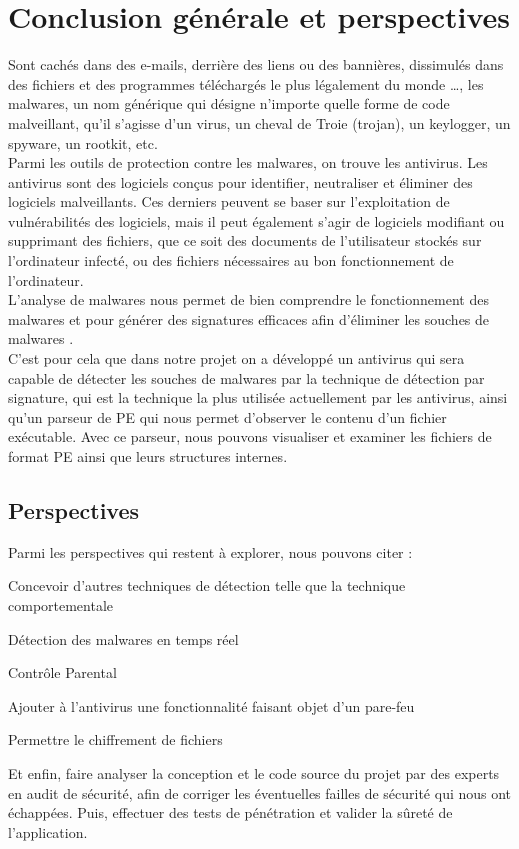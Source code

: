 \newpage
\chapter*{Conclusion générale et perspectives}
Sont cachés dans des e-mails, derrière des liens ou des bannières, dissimulés dans des fichiers et des programmes téléchargés le plus légalement du monde …, les malwares, un nom générique qui désigne n'importe quelle forme de code malveillant, qu'il s'agisse d'un virus, un cheval de Troie (trojan), un keylogger, un spyware, un rootkit, etc.\\

Parmi les outils de protection contre les malwares, on trouve les antivirus. Les antivirus sont des logiciels conçus pour identifier, neutraliser et éliminer des logiciels malveillants. Ces derniers peuvent se baser sur l'exploitation de vulnérabilités des logiciels, mais il peut également s'agir de logiciels modifiant ou supprimant des fichiers, que ce soit des documents de l'utilisateur stockés sur l'ordinateur infecté, ou des fichiers nécessaires au bon fonctionnement de l'ordinateur.\\

L'analyse de malwares nous permet de bien comprendre le fonctionnement des malwares et pour générer des signatures efficaces afin d'éliminer les souches de malwares .\\

C'est pour cela que dans notre projet on a développé un antivirus qui sera capable de détecter les souches de malwares par la technique de détection par signature, qui est la technique la plus utilisée actuellement par les antivirus, ainsi qu'un parseur de PE qui nous permet d'observer le contenu d'un fichier exécutable. Avec ce parseur,  nous pouvons visualiser et examiner les fichiers de format PE ainsi que leurs structures internes.\\

\section*{Perspectives}

Parmi les perspectives qui restent à explorer, nous pouvons citer :\\
\begin{list}{•}{}
\item Concevoir d'autres techniques de détection telle que la technique comportementale
\item Détection des malwares en temps réel
\item Contrôle Parental
\item Ajouter à l'antivirus une fonctionnalité faisant objet d'un pare-feu
\item Permettre le chiffrement de fichiers
\item Et enfin, faire analyser la conception et le code source du projet par des experts en audit de sécurité, afin de corriger les éventuelles failles de sécurité qui nous ont échappées. Puis, effectuer des tests de pénétration et valider la sûreté de l’application.

\end{list}

